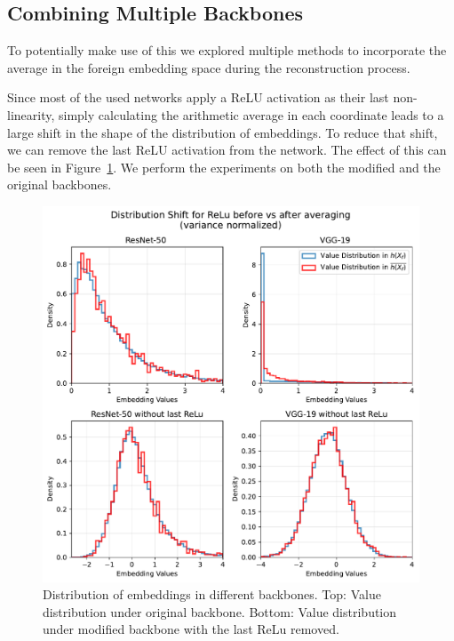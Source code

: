 \documentclass[10pt,twocolumn]{article}
\begin{document}
\subsection{Combining Multiple Backbones}\label{combining_backbones}
To potentially make use of this we explored multiple methods to incorporate the average in the foreign embedding space during the reconstruction process.

Since most of the used networks apply a ReLU activation as their last non-linearity, simply calculating the arithmetic average in each coordinate leads to a large shift in the shape of the distribution of embeddings.
To reduce that shift, we can remove the last ReLU activation from the network.
The effect of this can be seen in Figure~\ref{fig:relu_norelu_distribution_shift}.
We perform the experiments on both the modified and the original backbones.

\begin{figure}[ht]
    \centering
    \includegraphics[width=\linewidth]{figures/relu-norelu-distribution-shift}
    \caption{
       Distribution of embeddings in different backbones.
       Top: Value distribution under original backbone.
       Bottom: Value distribution under modified backbone with the last ReLu removed.
    }
    \label{fig:relu_norelu_distribution_shift}
\end{figure}
\end{document}
